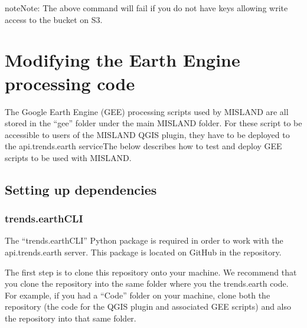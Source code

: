 \documentclass[letterpaper,10pt,english]{sphinxmanual}
\begin{document}
\begin{sphinxVerbatim}[commandchars=\\\{\}]
 
\end{sphinxVerbatim}

\begin{sphinxadmonition}{note}{Note:}
\sphinxAtStartPar
The above command will fail if you do not have keys allowing write
access to the  bucket on S3.
\end{sphinxadmonition}


\section{Modifying the Earth Engine processing code}
\label{\detokenize{Qgis_Plugin/plugin_development:modifying-the-earth-engine-processing-code}}
\sphinxAtStartPar
The Google Earth Engine (GEE) processing scripts used by MISLAND are all
stored in the “gee” folder under the main MISLAND folder. For these script
to be accessible to users of the MISLAND QGIS plugin, they have to be
deployed to the api.trends.earth serviceThe below
describes how to test and deploy GEE scripts to be used with MISLAND.


\subsection{Setting up dependencies}
\label{\detokenize{Qgis_Plugin/plugin_development:setting-up-dependencies}}

\subsubsection{trends.earth\sphinxhyphen{}CLI}
\label{\detokenize{Qgis_Plugin/plugin_development:trends-earth-cli}}
\sphinxAtStartPar
The “trends.earth\sphinxhyphen{}CLI” Python package is required in order to work with the
api.trends.earth server. This package is located on GitHub in the
repository.

\sphinxAtStartPar
The first step is to clone this repository onto your machine. We recommend that
you clone the repository into the same folder where you the trends.earth code.
For example, if you had a “Code” folder on your machine, clone both the
 repository (the
code for the QGIS plugin and associated GEE scripts) and also the
 repository
into that same folder.
\end{document}
